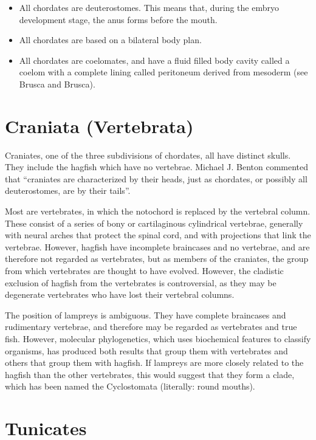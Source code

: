 \begin{itemize}
\tightlist
\item
  All chordates are deuterostomes. This means that, during the embryo
  development stage, the anus forms before the mouth.
\item
  All chordates are based on a bilateral body plan.
\item
  All chordates are coelomates, and have a fluid filled body cavity
  called a coelom with a complete lining called peritoneum derived from
  mesoderm (see Brusca and Brusca).
\end{itemize}

\section{Craniata (Vertebrata)}\label{craniata-vertebrata}

Craniates, one of the three subdivisions of chordates, all have distinct
skulls. They include the hagfish which have no vertebrae. Michael J.
Benton commented that ``craniates are characterized by their heads, just
as chordates, or possibly all deuterostomes, are by their tails''.

Most are vertebrates, in which the notochord is replaced by the
vertebral column. These consist of a series of bony or cartilaginous
cylindrical vertebrae, generally with neural arches that protect the
spinal cord, and with projections that link the vertebrae. However,
hagfish have incomplete braincases and no vertebrae, and are therefore
not regarded as vertebrates, but as members of the craniates, the group
from which vertebrates are thought to have evolved. However, the
cladistic exclusion of hagfish from the vertebrates is controversial, as
they may be degenerate vertebrates who have lost their vertebral
columns.

The position of lampreys is ambiguous. They have complete braincases and
rudimentary vertebrae, and therefore may be regarded as vertebrates and
true fish. However, molecular phylogenetics, which uses biochemical
features to classify organisms, has produced both results that group
them with vertebrates and others that group them with hagfish. If
lampreys are more closely related to the hagfish than the other
vertebrates, this would suggest that they form a clade, which has been
named the Cyclostomata (literally: round mouths).

\section{Tunicates}\label{tunicates}

